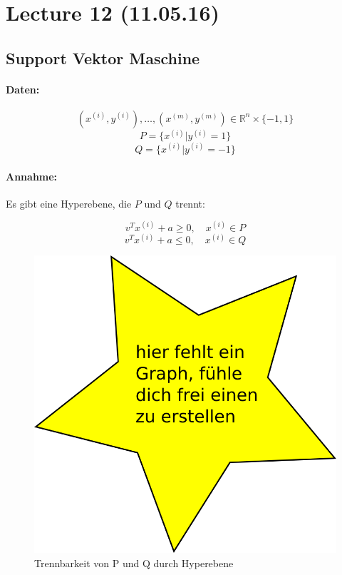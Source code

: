 \bgroup
\newcommand{\vi}[2]{#1^{(#2)}}
\newcommand{\data}{(x^{(i)},y^{(i)}),\dots,(x^{(m)},y^{(m)})}
\newcommand{\R}{\mathbb{R}}
\newcommand{\minn}[1]{\underset{#1}{\min}\medspace}
\newcommand{\maxx}[1]{\underset{#1}{\max}\medspace}
\newcommand{\xj}[1]{\phi_{x_j, y=#1}}
\newcommand{\nalph}{\vi{\hat{\alpha}}{i}}
\newcommand{\gi}[1]{\vi{g}{i}(#1)}
\newcommand{\lagra}[2]{L(#1,#2)}
\newcommand{\su}[1]{\sum_{#1 = 1}^{m}}

\section*{Lecture 12 (11.05.16)}
	\subsection*{Support Vektor Maschine}
	\paragraph*{Daten:}
		\[ \data \in \R^n \times \{-1,1\} \]
		\[ P = \{\vi{x}{i} | \vi{y}{i} = 1\} \]
		\[ Q = \{\vi{x}{i} | \vi{y}{i} = -1\} \]
	\paragraph{Annahme:}
		Es gibt eine Hyperebene, die $ P $ und $ Q $ trennt:
		
		\begin{figure}[H]
			\centering
			\begin{minipage}[]{0.45\linewidth}
				\[ v^T\vi{x}{i} + a \geq 0 ,\quad \vi{x}{i} \in P\]
				\[ v^T\vi{x}{i} + a \leq 0 ,\quad \vi{x}{i} \in Q\]
			\end{minipage}
			\hfill
			\begin{minipage}[]{0.45\linewidth}
				\centering
				\includegraphics[width=.75\linewidth]{graphs/dummy}
				\caption{Trennbarkeit von P und Q durch Hyperebene}
			\end{minipage}%
		\end{figure}
		
